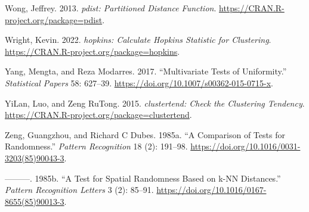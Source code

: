 \begin{CSLReferences}{1}{0}
\leavevmode{}%
Wong, Jeffrey. 2013. \emph{{pdist}: Partitioned Distance Function}. \url{https://CRAN.R-project.org/package=pdist}.

\leavevmode{}%
Wright, Kevin. 2022. \emph{{hopkins}: Calculate Hopkins Statistic for Clustering}. \url{https://CRAN.R-project.org/package=hopkins}.

\leavevmode{}%
Yang, Mengta, and Reza Modarres. 2017. {``Multivariate Tests of Uniformity.''} \emph{Statistical Papers} 58: 627--39. \url{https://doi.org/10.1007/s00362-015-0715-x}.

\leavevmode{}%
YiLan, Luo, and Zeng RuTong. 2015. \emph{{clustertend}: Check the Clustering Tendency}. \url{https://CRAN.R-project.org/package=clustertend}.

\leavevmode{}%
Zeng, Guangzhou, and Richard C Dubes. 1985a. {``A Comparison of Tests for Randomness.''} \emph{Pattern Recognition} 18 (2): 191--98. \url{https://doi.org/10.1016/0031-3203(85)90043-3}.

\leavevmode{}%
---------. 1985b. {``A Test for Spatial Randomness Based on {k-NN} Distances.''} \emph{Pattern Recognition Letters} 3 (2): 85--91. \url{https://doi.org/10.1016/0167-8655(85)90013-3}.

\end{CSLReferences}



\address{%
Kevin Wright\\
Corteva Agriscience\\%
6805 NW 62nd Ave\\ Johnston, IA 50131\\
%
%
\textit{ORCiD: \href{https://orcid.org/0000-0002-0617-8673}{0000-0002-0617-8673}}\\%
\href{mailto:kw.stat@gmail.com}{\nolinkurl{kw.stat@gmail.com}}%
}
